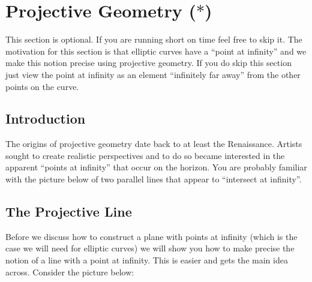 \documentclass[12 pt]{article}
\begin{document}
\newpage
\section{Projective Geometry ($*$)}
This section is optional. If you are running short on time feel free to skip it. The motivation for this section is that elliptic curves have a ``point at infinity'' and we make this notion precise using projective geometry. If you do skip this section just view the point at infinity as an element ``infinitely far away'' from the other points on the curve.

\subsection{Introduction}
The origins of projective geometry date back to at least the Renaissance. Artists sought to create realistic perspectives and to do so became interested in the apparent ``points at infinity'' that occur on the horizon. You are probably familiar with the picture below of two parallel lines that appear to ``intersect at infinity''.

\begin{center}
\end{center}

\subsection{The Projective Line}
Before we discuss how to construct a plane with points at infinity (which is the case we will need for elliptic curves) we will show you how to make precise the notion of a line with a point at infinity. This is easier and gets the main idea across.
\newpage
Consider the picture below:
\begin{center}
\end{center}
\end{document}
